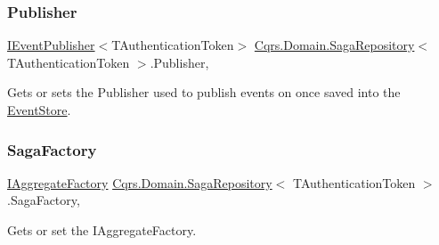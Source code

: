 \mbox{\label{classCqrs_1_1Domain_1_1SagaRepository_a94707dc4549d096ea3cf5d241117495a_a94707dc4549d096ea3cf5d241117495a}} 
\subsubsection{\texorpdfstring{Publisher}{Publisher}}
{\footnotesize\ttfamily \hyperlink{interfaceCqrs_1_1Events_1_1IEventPublisher}{I\+Event\+Publisher}$<$T\+Authentication\+Token$>$ \hyperlink{classCqrs_1_1Domain_1_1SagaRepository}{Cqrs.\+Domain.\+Saga\+Repository}$<$ T\+Authentication\+Token $>$.Publisher\hspace{0.3cm}{\ttfamily [get]}, {\ttfamily [protected]}}



Gets or sets the Publisher used to publish events on once saved into the \hyperlink{namespaceCqrs_1_1EventStore}{Event\+Store}. 

\mbox{\label{classCqrs_1_1Domain_1_1SagaRepository_a578164fa38728f3a23ca41d8c81611e0_a578164fa38728f3a23ca41d8c81611e0}} 
\subsubsection{\texorpdfstring{Saga\+Factory}{SagaFactory}}
{\footnotesize\ttfamily \hyperlink{interfaceCqrs_1_1Domain_1_1Factories_1_1IAggregateFactory}{I\+Aggregate\+Factory} \hyperlink{classCqrs_1_1Domain_1_1SagaRepository}{Cqrs.\+Domain.\+Saga\+Repository}$<$ T\+Authentication\+Token $>$.Saga\+Factory\hspace{0.3cm}{\ttfamily [get]}, {\ttfamily [protected]}}



Gets or set the I\+Aggregate\+Factory. 

